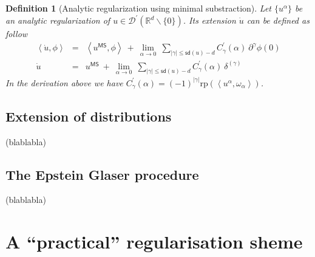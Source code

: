\documentclass[10pt]{book}
\newcommand{\sd}{\mathsf{sd}}
\newcommand{\abs}[1]{\left|#1\right|}
\newcommand{\sm}[1]{\left\langle#1\right\rangle}
\newcommand{\Dcal}{\mathcal{D}}
\newcommand{\Rbb}{\mathbb{R}}
\theoremstyle{break}
\newtheorem{definition}{Definition}
\begin{document}
\begin{definition}[Analytic regularization using minimal substraction]
 Let $\{u^\alpha\}$ be an analytic regularization of $u \in \Dcal^\prime(\Rbb^d \backslash \{0\})$. Its extension $\dot{u}$ can be defined as follow
 \begin{eqnarray*}
  \sm{\dot{u},\phi} &=& \sm{u^{\mathsf{MS}},\phi} \ + \ \lim_{\alpha \to 0} \ \sum_{\abs{\gamma} \leq \sd(u) -d} C^{\prime}_{\gamma}(\alpha) \ \partial^\gamma \phi(0) \\
  \dot{u} &=& u^{\mathsf{MS}} \ + \ \lim_{\alpha \to 0} \ \sum_{\abs{\gamma} \leq \sd(u) -d} C^{\prime}_{\gamma}(\alpha) \ \delta^{(\gamma)} 
 \end{eqnarray*}
 In the derivation above we have $C^\prime_\gamma(\alpha) = (-1)^{\abs{\gamma}} \text{rp}\left(\sm{u^\alpha , \omega_\alpha}\right)$. 
\end{definition}








\section{Extension of distributions}



(blablabla)



\section{The Epstein Glaser procedure}



(blablabla)



\chapter{A ``practical'' regularisation sheme}


\end{document}
